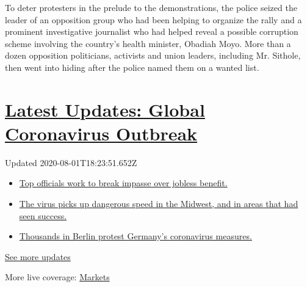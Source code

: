 To deter protesters in the prelude to the demonstrations, the police
seized the leader of an opposition group who had been helping to
organize the rally and a prominent investigative journalist who had
helped reveal a possible corruption scheme involving the country's
health minister, Obadiah Moyo. More than a dozen opposition politicians,
activists and union leaders, including Mr. Sithole, then went into
hiding after the police named them on a wanted list.

\hypertarget{latest-updates-global-coronavirus-outbreak}{%
\section{\texorpdfstring{\href{https://www.nytimes.com/2020/08/01/world/coronavirus-covid-19.html?action=click\&pgtype=Article\&state=default\&region=MAIN_CONTENT_1\&context=storylines_live_updates}{Latest
Updates: Global Coronavirus
Outbreak}}{Latest Updates: Global Coronavirus Outbreak}}\label{latest-updates-global-coronavirus-outbreak}}

Updated 2020-08-01T18:23:51.652Z

\begin{itemize}
\tightlist
\item
  \href{https://www.nytimes.com/2020/08/01/world/coronavirus-covid-19.html?action=click\&pgtype=Article\&state=default\&region=MAIN_CONTENT_1\&context=storylines_live_updates\#link-3ac56579}{Top
  officials work to break impasse over jobless benefit.}
\item
  \href{https://www.nytimes.com/2020/08/01/world/coronavirus-covid-19.html?action=click\&pgtype=Article\&state=default\&region=MAIN_CONTENT_1\&context=storylines_live_updates\#link-8796723}{The
  virus picks up dangerous speed in the Midwest, and in areas that had
  seen success.}
\item
  \href{https://www.nytimes.com/2020/08/01/world/coronavirus-covid-19.html?action=click\&pgtype=Article\&state=default\&region=MAIN_CONTENT_1\&context=storylines_live_updates\#link-25930521}{Thousands
  in Berlin protest Germany's coronavirus measures.}
\end{itemize}

\href{https://www.nytimes.com/2020/08/01/world/coronavirus-covid-19.html?action=click\&pgtype=Article\&state=default\&region=MAIN_CONTENT_1\&context=storylines_live_updates}{See
more updates}

More live coverage:
\href{https://www.nytimes.com/live/2020/07/31/business/stock-market-today-coronavirus?action=click\&pgtype=Article\&state=default\&region=MAIN_CONTENT_1\&context=storylines_live_updates}{Markets}

